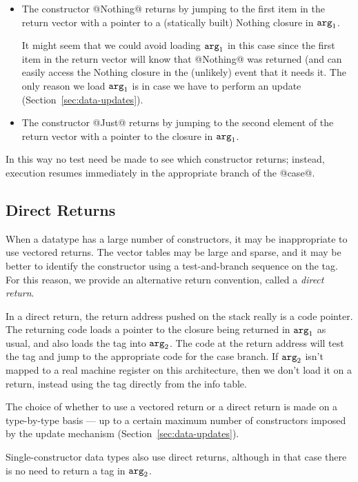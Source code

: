 \documentclass[11pt]{article}
\newcommand{\Arg}[1]{\mbox{${\tt arg}_{#1}$}}
\newcommand{\secref}[1]{Section~\ref{sec:#1}}
\newcommand{\Subsection}[2]{\subsection{#1}\label{sec:#2}}
\begin{document}
\begin{itemize}

\item

The constructor @Nothing@ returns by jumping to the first item in the
return vector with a pointer to a (statically built) Nothing closure
in \Arg{1}.  

It might seem that we could avoid loading \Arg{1} in this case since the
first item in the return vector will know that @Nothing@ was returned
(and can easily access the Nothing closure in the (unlikely) event
that it needs it.  The only reason we load \Arg{1} is in case we have to
perform an update (\secref{data-updates}).

\item 

The constructor @Just@ returns by jumping to the second element of the
return vector with a pointer to the closure in \Arg{1}.  

\end{itemize}

In this way no test need be made to see which constructor returns;
instead, execution resumes immediately in the appropriate branch of
the @case@.

\Subsection{Direct Returns}{direct-returns}

When a datatype has a large number of constructors, it may be
inappropriate to use vectored returns.  The vector tables may be
large and sparse, and it may be better to identify the constructor
using a test-and-branch sequence on the tag.  For this reason, we
provide an alternative return convention, called a \emph{direct
return}.

In a direct return, the return address pushed on the stack really is a
code pointer.  The returning code loads a pointer to the closure being
returned in \Arg{1} as usual, and also loads the tag into \Arg{2}.
The code at the return address will test the tag and jump to the
appropriate code for the case branch.  If \Arg{2} isn't mapped to a
real machine register on this architecture, then we don't load it on a
return, instead using the tag directly from the info table.

The choice of whether to use a vectored return or a direct return is
made on a type-by-type basis --- up to a certain maximum number of
constructors imposed by the update mechanism
(\secref{data-updates}).

Single-constructor data types also use direct returns, although in
that case there is no need to return a tag in \Arg{2}.
\end{document}
